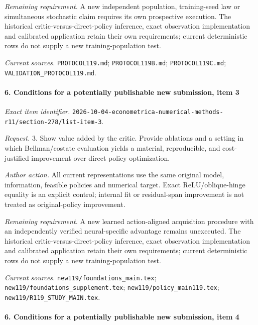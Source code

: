 \par\emph{Remaining requirement.} A new independent population, training-seed law or simultaneous stochastic claim requires its own prospective execution. The historical critic-versus-direct-policy inference, exact observation implementation and calibrated application retain their own requirements; current deterministic rows do not supply a new training-population test.

\par\emph{Current sources.} \nolinkurl{PROTOCOL119.md}; \nolinkurl{PROTOCOL119B.md}; \nolinkurl{PROTOCOL119C.md}; \nolinkurl{VALIDATION_PROTOCOL119.md}.

\paragraph{6. Conditions for a potentially publishable new submission, item 3}

\emph{Exact item identifier.} \nolinkurl{2026-10-04-econometrica-numerical-methods-r11/section-278/list-item-3}.

\par\emph{Request.} 3. Show value added by the critic. Provide ablations and a setting in which Bellman/\allowbreak{}costate evaluation yields a material, reproducible, and cost-justified improvement over direct policy optimization.

\par\emph{Author action.} All current representations use the same original model, information, feasible policies and numerical target. Exact ReLU/\allowbreak{}oblique-hinge equality is an explicit control; internal fit or residual-span improvement is not treated as original-policy improvement.

\par\emph{Remaining requirement.} A new learned action-aligned acquisition procedure with an independently verified neural-specific advantage remains unexecuted. The historical critic-versus-direct-policy inference, exact observation implementation and calibrated application retain their own requirements; current deterministic rows do not supply a new training-population test.

\par\emph{Current sources.} \nolinkurl{new119/foundations_main.tex}; \nolinkurl{new119/foundations_supplement.tex}; \nolinkurl{new119/policy_main119.tex}; \nolinkurl{new119/R119_STUDY_MAIN.tex}.

\paragraph{6. Conditions for a potentially publishable new submission, item 4}

